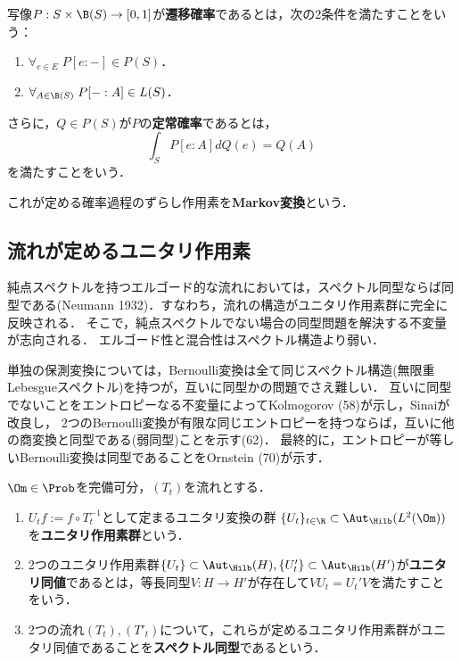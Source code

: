 \documentclass[uplatex,dvipdfmx]{jsreport}
\begin{document}
\begin{definition}
    写像$P:S\times\B(S)\to[0,1]$が\textbf{遷移確率}であるとは，次の2条件を満たすことをいう：
    \begin{enumerate}
        \item $\forall_{e\in E}\;P[e:-]\in P(S)$．
        \item $\forall_{A\in\B(S)}\;P[-:A]\in L(S)$．
    \end{enumerate}
    さらに，$Q\in P(S)$が$P$の\textbf{定常確率}であるとは，
    \[\int_SP[e:A]dQ(e)=Q(A)\]
    を満たすことをいう．
\end{definition}

\begin{example}
    これが定める確率過程のずらし作用素を\textbf{Markov変換}という．
\end{example}

\subsection{流れが定めるユニタリ作用素}

\begin{tcolorbox}[colframe=ForestGreen, colback=ForestGreen!10!white,breakable,colbacktitle=ForestGreen!40!white,coltitle=black,fonttitle=\bfseries\sffamily,
title=]
    純点スペクトルを持つエルゴード的な流れにおいては，スペクトル同型ならば同型である(Neumann 1932)．すなわち，流れの構造がユニタリ作用素群に完全に反映される．
    そこで，純点スペクトルでない場合の同型問題を解決する不変量が志向される．
    エルゴード性と混合性はスペクトル構造より弱い．

    単独の保測変換については，Bernoulli変換は全て同じスペクトル構造(無限重Lebesgueスペクトル)を持つが，互いに同型かの問題でさえ難しい．
    互いに同型でないことをエントロピーなる不変量によってKolmogorov (58)が示し，Sinaiが改良し，
    2つのBernoulli変換が有限な同じエントロピーを持つならば，互いに他の商変換と同型である(弱同型)ことを示す(62)．
    最終的に，エントロピーが等しいBernoulli変換は同型であることをOrnstein (70)が示す．
\end{tcolorbox}

\begin{definition}
    $\Om\in\Prob$を完備可分，$(T_t)$を流れとする．
    \begin{enumerate}
        \item $U_tf:=f\circ T^{-1}_t$として定まるユニタリ変換の群
        $\{U_t\}_{t\in\R}\subset\Aut_\Hilb(L^2(\Om))$を\textbf{ユニタリ作用素群}という．
        \item 2つのユニタリ作用素群$\{U_t\}\subset\Aut_\Hilb(H),\{U'_t\}\subset\Aut_\Hilb(H')$が\textbf{ユニタリ同値}であるとは，等長同型$V:H\to H'$が存在して$VU_t=U_t'V$を満たすことをいう．
        \item 2つの流れ$(T_t),(T'_t)$について，これらが定めるユニタリ作用素群がユニタリ同値であることを\textbf{スペクトル同型}であるという．
    \end{enumerate}
\end{definition}
\end{document}

